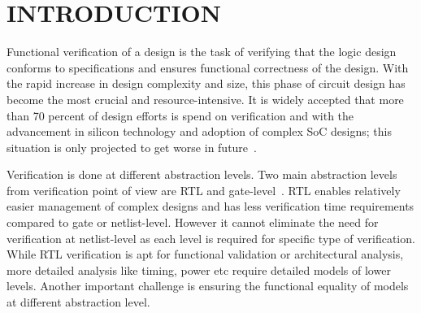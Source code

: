 \chapter{INTRODUCTION}

Functional verification of a design is the task of verifying that the logic design conforms to specifications and ensures functional correctness of the design.  With the rapid increase in design complexity and size, this phase of circuit design has become the most crucial and resource-intensive. It is widely accepted that more than 70 percent of design efforts is spend on verification and with the advancement in silicon technology and adoption of complex SoC designs; this situation is only projected to get worse in future~\citep{phd:zhang}. 

Verification is done at different abstraction levels. Two main abstraction levels from verification point of view are RTL and gate-level~\citep{phd:zhang}. RTL enables relatively easier management of complex designs and has less verification time requirements compared to gate or netlist-level. However it cannot eliminate the need for verification at netlist-level as each level is required for specific type of verification. While RTL verification is apt for functional validation or architectural analysis, more detailed analysis like timing, power etc require detailed models of lower levels. Another important challenge is ensuring the functional equality of models at different abstraction level.  

